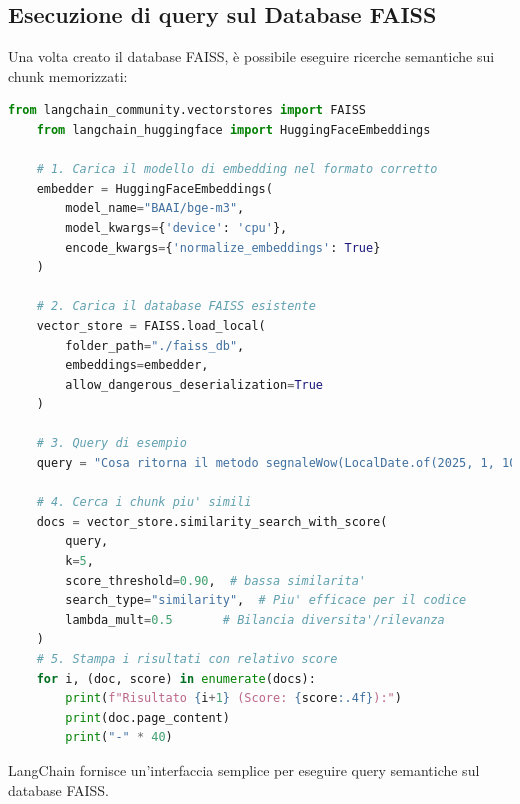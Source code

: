 \documentclass[12pt,a4paper,openright,twoside]{book}
\begin{document}
\subsection{Esecuzione di query sul Database FAISS}
    Una volta creato il database FAISS, è possibile eseguire ricerche semantiche sui chunk memorizzati:

    \begin{lstlisting}[language=Python, caption={Esecuzione di una query sul database FAISS}, label={lst:query}]
    from langchain_community.vectorstores import FAISS
    from langchain_huggingface import HuggingFaceEmbeddings

    # 1. Carica il modello di embedding nel formato corretto
    embedder = HuggingFaceEmbeddings(
        model_name="BAAI/bge-m3",
        model_kwargs={'device': 'cpu'},
        encode_kwargs={'normalize_embeddings': True}
    )

    # 2. Carica il database FAISS esistente
    vector_store = FAISS.load_local(
        folder_path="./faiss_db",
        embeddings=embedder,
        allow_dangerous_deserialization=True
    )

    # 3. Query di esempio
    query = "Cosa ritorna il metodo segnaleWow(LocalDate.of(2025, 1, 10))?"

    # 4. Cerca i chunk piu' simili
    docs = vector_store.similarity_search_with_score(
        query,
        k=5,
        score_threshold=0.90,  # bassa similarita'
        search_type="similarity",  # Piu' efficace per il codice
        lambda_mult=0.5       # Bilancia diversita'/rilevanza
    )
    # 5. Stampa i risultati con relativo score
    for i, (doc, score) in enumerate(docs):
        print(f"Risultato {i+1} (Score: {score:.4f}):")
        print(doc.page_content)
        print("-" * 40)
    \end{lstlisting}
LangChain fornisce un'interfaccia semplice per eseguire query semantiche sul database FAISS.
\end{document}

